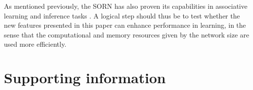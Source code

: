 \documentclass[10pt,letterpaper]{article}
\begin{document}
As mentioned previously, the SORN has also proven its capabilities in associative learning and inference tasks \cite{Hartmann_2016}. A logical step should thus be to test whether the new features presented in this paper can enhance performance in learning, in the sense that the computational and memory resources given by the network size are used more efficiently. 

\nolinenumbers

%
%
% 
\newpage


\newpage

\section*{Supporting information}
\end{document}
